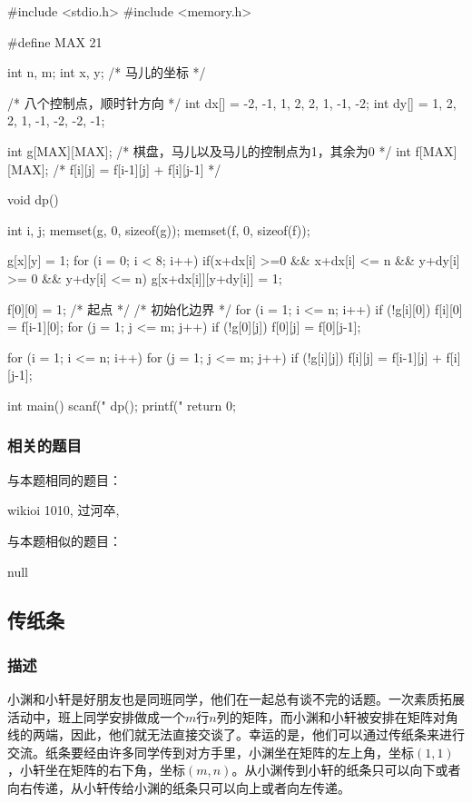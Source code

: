 \begin{Codex}[label=river.c]
#include <stdio.h>
#include <memory.h>

#define MAX 21

int n, m;
int x, y; /* 马儿的坐标 */

/* 八个控制点，顺时针方向 */
int dx[] = {-2, -1, 1, 2, 2, 1, -1, -2};
int dy[] = {1, 2, 2, 1, -1, -2, -2, -1};

int g[MAX][MAX];  /* 棋盘，马儿以及马儿的控制点为1，其余为0 */
int f[MAX][MAX];  /* f[i][j] = f[i-1][j] + f[i][j-1] */

void dp() {
    int i, j;
    memset(g, 0, sizeof(g));
    memset(f, 0, sizeof(f));

    g[x][y] = 1;
    for (i = 0; i < 8; i++) if(x+dx[i] >=0 && x+dx[i] <= n &&
            y+dy[i] >= 0 && y+dy[i] <= n){
        g[x+dx[i]][y+dy[i]] = 1;
    }

    f[0][0] = 1;  /* 起点 */
    /* 初始化边界 */
    for (i = 1; i <= n; i++) if (!g[i][0]) f[i][0] = f[i-1][0];
    for (j = 1; j <= m; j++) if (!g[0][j]) f[0][j] = f[0][j-1];

    for (i = 1; i <= n; i++) {
        for (j = 1; j <= m; j++) {
            if (!g[i][j]) f[i][j] = f[i-1][j] + f[i][j-1];
        }
    }
}

int main() {
    scanf("%
    dp();
    printf("%
    return 0;
}
\end{Codex}

\subsubsection{相关的题目}
与本题相同的题目：
\begindot
\item wikioi 1010, 过河卒, 
\myenddot

与本题相似的题目：
\begindot
\item  null
\myenddot


\subsection{传纸条}

\subsubsection{描述}
小渊和小轩是好朋友也是同班同学，他们在一起总有谈不完的话题。一次素质拓展活动中，班上同学安排做成一个$m$行$n$列的矩阵，而小渊和小轩被安排在矩阵对角线的两端，因此，他们就无法直接交谈了。幸运的是，他们可以通过传纸条来进行交流。纸条要经由许多同学传到对方手里，小渊坐在矩阵的左上角，坐标$(1,1)$，小轩坐在矩阵的右下角，坐标$(m,n)$。从小渊传到小轩的纸条只可以向下或者向右传递，从小轩传给小渊的纸条只可以向上或者向左传递。


